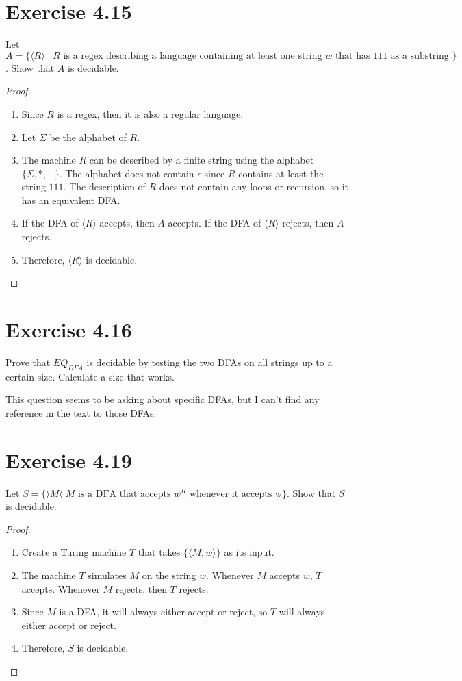 \documentclass{article}
\newcommand{\where}{\mid}
\begin{document}
\section{Exercise 4.15}

Let $A = \{ \langle R \rangle \where R \text{ is a regex describing a language
containing at least one string } w \text{ that has 111 as a substring } \}$.
Show that $A$ is decidable.

\begin{proof}
	\mbox{}
	\begin{enumerate}
	  \item Since $R$ is a regex, then it is also a regular language.
	  \item Let $\Sigma$ be the alphabet of $R$.
	  \item The machine $R$ can be described by a finite string using the alphabet
	  $\{ \Sigma, *, + \}$. The alphabet does not contain $\epsilon$ since $R$
	  contains at least the string $111$. The description of $R$ does not contain
	  any loops or recursion, so it has an equivalent DFA.
	  \item If the DFA of $\langle R \rangle$ accepts, then $A$ accepts. If the DFA
	  of $\langle R \rangle$ rejects, then $A$ rejects.
	  \item Therefore, $\langle R \rangle$ is decidable. \qedhere
	\end{enumerate}
\end{proof}

\section{Exercise 4.16}

Prove that $EQ_{DFA}$ is decidable by testing the two DFAs on all strings up to
a certain size. Calculate a size that works.

This question seems to be asking about specific DFAs, but I can't find any
reference in the text to those DFAs. 

\section{Exercise 4.19}

Let $S = \{ \rangle M \langle \where M \text{ is a DFA that accepts } w^R
\text{ whenever it accepts w} \}$. Show that $S$ is decidable.

\begin{proof}
	\mbox{}
	\begin{enumerate}
	  \item Create a Turing machine $T$ that takes $\{ \langle M, w \rangle \}$
	  as its input.
	  \item The machine $T$ simulates $M$ on the string $w$. Whenever $M$ accepts
	  $w$, $T$ accepts. Whenever $M$ rejects, then $T$ rejects. 
	  \item Since $M$ is a DFA, it will always either accept or reject, so $T$ will
	  always either accept or reject.
	  \item Therefore, $S$ is decidable. \qedhere
	\end{enumerate}
\end{proof}
\end{document}
